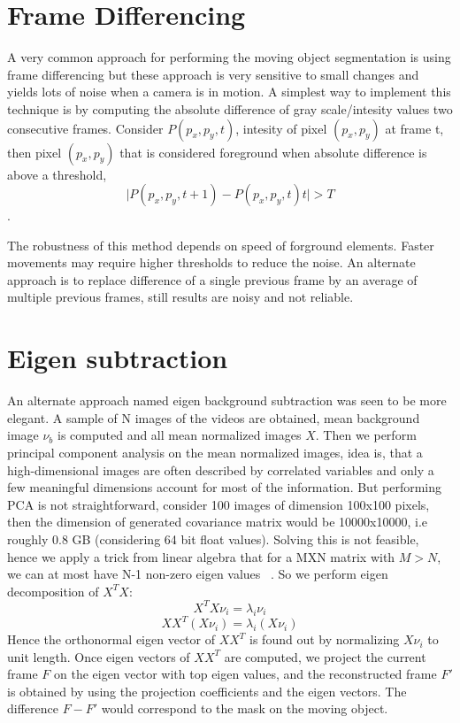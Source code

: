 \documentclass[MTech]{iitmdiss}
\begin{document}
\section{Frame Differencing}
A very common approach for performing the moving object segmentation is using frame differencing but these approach is very sensitive to small changes and yields lots of noise when a camera is in motion. A simplest way to implement this technique is by computing the absolute difference of gray scale/intesity values two consecutive frames. Consider $P(p_x,p_y,t)$, intesity of pixel $(p_x,p_y)$ at frame t, then pixel $(p_x,p_y)$ that is considered foreground when absolute difference is above a threshold,$$\vert P(p_x,p_y,t+1) - P(p_x,p_y,t)t\vert > T$$.
\par The robustness of this method depends on speed of forground elements. Faster movements may require higher thresholds to reduce the noise.  An alternate approach is to replace difference of a single previous frame  by an average of multiple previous frames, still results are noisy and not reliable.
\section{Eigen subtraction}
An alternate approach named eigen background subtraction was seen to be more elegant. A sample of N images of the videos are obtained, mean background image $\nu_b$ is computed and all mean normalized images $X$. Then we perform principal component analysis on the mean normalized images, idea is, that a high-dimensional images are often described by correlated variables and only a few meaningful dimensions account for most of the information. But performing PCA is not straightforward, consider 100 images of dimension 100x100 pixels, then the dimension of generated covariance matrix would be 10000x10000, i.e roughly 0.8 GB (considering 64 bit float values). Solving this is not feasible, hence we apply a trick from linear algebra that for a MXN matrix with $M>N$, we can at most have N-1 non-zero eigen values ~\cite{Duda01}. So we perform eigen decomposition of $X^TX$:
$$X^TX\nu_i=\lambda_i\nu_i$$
$$XX^T(X\nu_i)=\lambda_i(X\nu_i)$$
Hence the orthonormal eigen vector of $XX^T$ is found out by normalizing $X\nu_i$ to unit length. Once eigen vectors of $XX^T$  are computed, we project the current frame $F$ on the eigen vector with top eigen values, and the reconstructed frame $F'$ is obtained by using the projection coefficients and the eigen vectors. The difference $F-F'$ would correspond to the mask on the moving object. 
\end{document}
